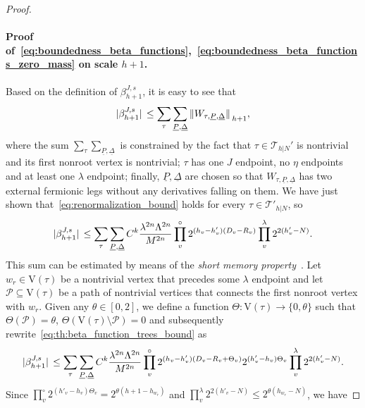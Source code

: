 \documentclass[a4paper, 11pt]{article}
\newcommand{\cutoff}{\Lambda}								%
\newcommand{\vrt}{\mathrm{V}}								%
\newcommand{\trees}{\mathcal{T}}							%
\theoremstyle{thm}
\begin{document}
\begin{proof}
\paragraph{Proof of~\eqref{eq:boundedness_beta_functions},~\eqref{eq:boundedness_beta_functions_zero_mass} on scale $h+1$.} Based on the definition of $\beta^{J, s}_{h+1}$, it is easy to see that
\begin{equation}
\abs*{\beta^{J, s}_{h+1}} \le \sum_\tau \sum_{\underline{P}, \underline{\Delta}} \norm*{W_{\tau, \underline{P}, \underline{\Delta}}}_{h+1},
\end{equation}
where the sum $\sum_\tau \sum_{\underline{P}, \underline{\Delta}}$ is constrained by the fact that $\tau \in \trees_{h|N}'$ is nontrivial and its first nonroot vertex is nontrivial; $\tau$ has one $J$ endpoint, no $\eta$ endpoints and at least one $\lambda$ endpoint; finally, $\underline{P}, \underline{\Delta}$ are chosen so that $W_{\tau, \underline{P}, \underline{\Delta}}$ has two external fermionic legs without any derivatives falling on them. We have just shown that~\eqref{eq:renormalization_bound} holds for every $\tau \in \trees'_{h|N}$, so
\begin{equation}
\label{eq:th:beta_function_trees_bound}
\abs*{\beta^{J, s}_{h+1}} \le \sum_\tau \sum_{\underline{P}, \underline{\Delta}} C^k \frac{\lambda^{2n} \cutoff^{2n}}{M^{2n}} \prod^\circ_v 2^{(h_v - h'_v)(D_v - R_v)} \prod_v^\lambda 2^{2(h'_v - N)}.
\end{equation}
This sum can be estimated by means of the \emph{short memory property}~\cite{Mastropietro_2007, Giuliani_Mastropietro_Porta_2019}. Let $w_r \in \vrt(\tau)$ be a nontrivial vertex that precedes some $\lambda$ endpoint and let $\mathscr{P} \subseteq \vrt(\tau)$ be a path of nontrivial vertices that connects the first nonroot vertex with $w_r$. Given any $\theta \in [0, 2]$, we define a function $\Theta \colon \vrt(\tau) \to \lbrace 0, \theta \rbrace$ such that $\Theta(\mathscr{P}) = \theta$, $\Theta(\vrt(\tau) \setminus \mathscr{P}) = 0$ and subsequently rewrite~\eqref{eq:th:beta_function_trees_bound} as
\begin{equation}
\abs*{\beta^{J, s}_{h+1}} \le \sum_\tau \sum_{\underline{P}, \underline{\Delta}} C^k \frac{\lambda^{2n} \cutoff^{2n}}{M^{2n}} \prod^\circ_v 2^{(h_v - h'_v)(D_v - R_v + \Theta_v)} 2^{(h'_v - h_v) \Theta_v} \prod_v^\lambda 2^{2(h'_v - N)}.
\end{equation}
Since $\prod_v^\circ 2^{(h'_v - h_v) \Theta_v} = 2^{\theta(h+1-h_{w_r})}$ and $\prod_v^\lambda 2^{2(h'_v - N)} \le 2^{\theta(h_{w_r} - N)}$, we have

\end{proof}
\end{document}
